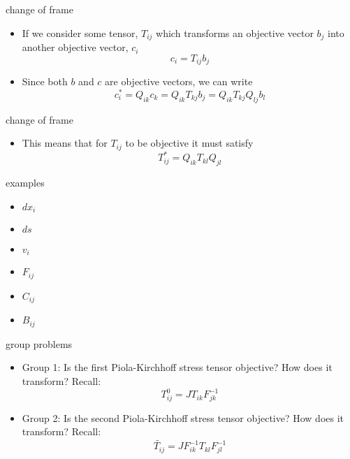 \documentclass[
  letterpaper,
  ignorenonframetext,
  aspectratio=43,
  handout,
  12pt]{beamer}
\providecommand{\tightlist}{%
  \setlength{\itemsep}{0pt}\setlength{\parskip}{0pt}}
\providecommand{\tightlist}{%
\setlength{\itemsep}{0pt}\setlength{\parskip}{0pt}}
\begin{document}
\begin{frame}{change of frame}
\protect\hypertarget{change-of-frame-4}{}
\begin{itemize}
\item
  If we consider some tensor, \(T_{ij}\) which transforms an objective
  vector \(b_j\) into another objective vector, \(c_i\)
  \[c_i = T_{ij}b_j\]
\item
  Since both \(b\) and \(c\) are objective vectors, we can write
  \[c_i^* = Q_{ik} c_k = Q_{ik} T_{kj} b_j = Q_{ik} T_{kj} Q_{lj} b_l\]
\end{itemize}
\end{frame}

\begin{frame}{change of frame}
\protect\hypertarget{change-of-frame-5}{}
\begin{itemize}
\tightlist
\item
  This means that for \(T_{ij}\) to be objective it must satisfy
  \[T_{ij}^* = Q_{ik} T_{kl} Q_{jl}\]
\end{itemize}
\end{frame}

\begin{frame}{examples}
\protect\hypertarget{examples}{}
\begin{itemize}
\tightlist
\item
  \(dx_i\)
\item
  \(ds\)
\item
  \(v_i\)
\item
  \(F_{ij}\)
\item
  \(C_{ij}\)
\item
  \(B_{ij}\)
\end{itemize}
\end{frame}

\begin{frame}{group problems}
\protect\hypertarget{group-problems}{}
\begin{itemize}
\tightlist
\item
  Group 1: Is the first Piola-Kirchhoff stress tensor objective? How
  does it transform? Recall: \[T_{ij}^0 = J T_{ik} F_{jk}^{-1}\]
\item
  Group 2: Is the second Piola-Kirchhoff stress tensor objective? How
  does it transform? Recall:
  \[\tilde{T_{ij}} = J F_{ik}^{-1} T_{kl} F_{jl}^{-1}\]
\end{itemize}
\end{frame}
\end{document}
